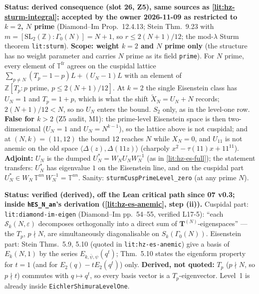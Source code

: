 \begin{hypothesis}\label{lit:hz-sturm-prime}
  \leanok
  \textbf{Status: derived consequence (slot 26, Z5), same sources as \ref{lit:hz-sturm-integral}; accepted by the owner 2026-11-09 as restricted to $k=2$, $N$ prime} (Diamond--Im Prop.~12.4.13; Stein Thm.~9.23 with
  $m=[\mathrm{SL}_2(\mathbb Z):\Gamma_0(N)]=N+1$, so $r\le 2(N+1)/12$; the mod-$\lambda$ Sturm theorem \texttt{lit:sturm}). \textbf{Scope: weight $k=2$ and $N$ prime only}
  (the structure has no weight parameter and carries $N$ prime as its field \texttt{prime}). For $N$ prime, every element of
  $\mathbb T^{\mathrm{fr}}$ agrees on the cuspidal lattice $\sum_{p\ne N}(T_p-1-p)L+(U_N-1)L$ with an element of $\mathbb Z[T_p:p\text{ prime},\,p\le 2(N+1)/12]$.
  At $k=2$ the single Eisenstein class has $U_N=1$ and $T_p=1+p$, which is what the shift $\tilde X_N=U_N+N$ records; $2(N+1)/12<N$, so no
  $U_N$ enters the bound. $S_2$ only, as in the level-one row. \textbf{False for $k>2$} (Z5 audit, M1): the prime-level Eisenstein space is then
  two-dimensional ($U_N=1$ and $U_N=N^{k-1}$), so the lattice above is not cuspidal; and at $(N,k)=(11,12)$ the bound $12$ reaches $N$ while $X_N=0$,
  and $U_{11}$ is not anemic on the old space $\langle\Delta(z),\Delta(11z)\rangle$ (charpoly $x^2-\tau(11)x+11^{11}$). \textbf{Adjoint:} $U_N$ is the
  dumped $U_N^*=W_NU_NW_N^{-1}$ (as in \ref{lit:hz-es-full}); the statement transfers: $U_N^*$ has eigenvalue $1$ on the Eisenstein line, and on the
  cuspidal part $U_N^*\in W_N\,\mathbb T^{an}\,W_N^{-1}=\mathbb T^{an}$. Sanity: \texttt{sturmCuspPrimeLevel\_zero} (at any prime $N$).
\end{hypothesis}

\begin{hypothesis}\label{lit:hz-semisimple-an}
  \textbf{Status: verified (derived), off the Lean critical path since 07 v0.3; inside \texttt{hES\_N\_an}'s derivation
  (\ref{lit:hz-es-anemic}, step (ii)).} Cuspidal part: \texttt{lit:diamond-im-eigen} (Diamond--Im
  pp.~54--55, verified L17-5): ``each $\mathcal S_k(N,\varepsilon)$ decomposes orthogonally into a direct sum of $\mathbf T^{(N)}$-eigenspaces'' ---
  the $T_p$, $p\nmid N$, are simultaneously diagonalisable on $S_k(\Gamma_0(N))$. Eisenstein part: Stein Thms.~5.9, 5.10 (quoted in
  \texttt{lit:hz-es-anemic}) give a basis of $E_k(N,1)$ by the series $E_{k,\bar\psi,\psi}(q^t)$; Thm.~5.10 states the eigenform property for $t=1$
  (and for $E_2(q)-tE_2(q^t)$) only. \textbf{Derived, not quoted:} $T_p$ ($p\nmid N$, so $p\nmid t$) commutes with $q\mapsto q^t$, so every basis
  vector is a $T_p$-eigenvector. Level~1 is already inside \texttt{EichlerShimuraLevelOne}.
\end{hypothesis}

